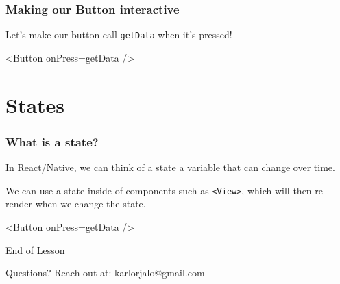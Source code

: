 \documentclass{beamer}
\begin{document}
  \begin{frame}[fragile]
    \frametitle{Making our Button interactive}
    Let's make our button call \verb|getData| when it's pressed!
    \begin{jscodesmall}
<Button onPress={getData} />
    \end{jscodesmall}
  \end{frame}

  \section{States}

  \begin{frame}[fragile]
    \frametitle{What is a state?}
    In React/Native, we can think of a state a variable that can change over time. 
    
    We can use a state inside of components such as \verb|<View>|, which will then re-render when we change the state. 
    \begin{jscodesmall}
<Button onPress={getData} />
    \end{jscodesmall}
  \end{frame}


  \appendix

  \begin{frame}[standout]
    End of Lesson

    {\small Questions? Reach out at:}
    {\footnotesize karlorjalo@gmail.com}
  \end{frame}
\end{document}
